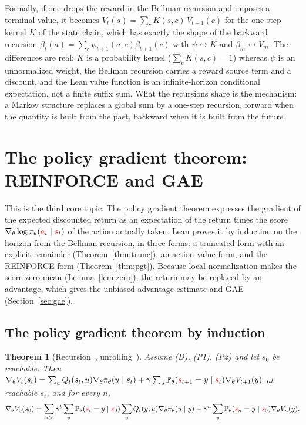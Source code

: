 \documentclass[11pt,a4paper]{article}
\newtheorem{theorem}{Theorem}[section]
\newcommand{\Prb}{\mathbb{P}}
\newcommand{\rv}[1]{{\color{red}#1}}       %
\newcommand{\sv}{\rv{s}}
\newcommand{\av}{\rv{a}}
\newcommand{\grad}{\nabla_{\theta}}
\begin{document}
Formally, if one drops the reward in the Bellman recursion and imposes a terminal value, it becomes $V_t(s)=\sum_cK(s,c)\,V_{t+1}(c)$ for the one-step kernel $K$ of the state chain, which has exactly the shape of the backward recursion $\beta_t(a)=\sum_c\psi_{t+1}(a,c)\beta_{t+1}(c)$ with $\psi\leftrightarrow K$ and $\beta_m\leftrightarrow V_m$.
The differences are real: $K$ is a probability kernel ($\sum_cK(s,c)=1$) whereas $\psi$ is an unnormalized weight, the Bellman recursion carries a reward source term and a discount, and the Lean value function is an infinite-horizon conditional expectation, not a finite suffix sum.
What the recursions share is the mechanism: a Markov structure replaces a global sum by a one-step recursion, forward when the quantity is built from the past, backward when it is built from the future.

\section{The policy gradient theorem: REINFORCE and GAE}
\label{sec:pg}

This is the third core topic.
The policy gradient theorem expresses the gradient of the expected discounted return as an expectation of the return times the score $\grad\log\pi_\theta(\av_t\mid\sv_t)$ of the action actually taken.
Lean proves it by induction on the horizon from the Bellman recursion, in three forms: a truncated form with an explicit remainder (Theorem~\ref{thm:trunc}), an action-value form, and the REINFORCE form (Theorem~\ref{thm:pgt}).
Because local normalization makes the score zero-mean (Lemma~\ref{lem:zero}), the return may be replaced by an advantage, which gives the unbiased advantage estimate and GAE (Section~\ref{sec:gae}).

\subsection{The policy gradient theorem by induction}
\label{sec:pgind}
\begin{theorem}[Recursion~\cite{lemma_recursion}, unrolling~\cite{lemma_induct}]
\label{thm:rec}
Assume (D), (P1), (P2) and let $s_0$ be reachable.
Then $\grad V_t(s_t)=\sum_uQ_t(s_t,u)\grad\pi_\theta(u\mid s_t)+\gamma\sum_y\Prb_\theta(\sv_{t+1}=y\mid\sv_t)\grad V_{t+1}(y)$ at reachable $s_t$, and for every $n$,
\[
\grad V_0(s_0)=\sum_{t<n}\gamma^t\sum_y\Prb_\theta(\sv_t=y\mid\sv_0)\sum_uQ_t(y,u)\grad\pi_\theta(u\mid y)+\gamma^n\sum_y\Prb_\theta(\sv_n=y\mid\sv_0)\grad V_n(y).
\]
\end{theorem}
\end{document}
